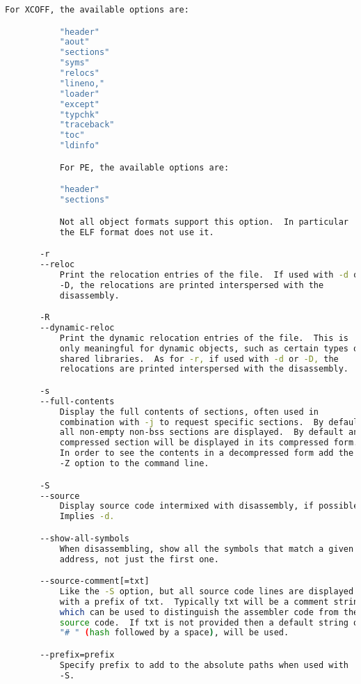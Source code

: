 {{\begin{lstlisting}[language=bash]
           For XCOFF, the available options are:

           "header"
           "aout"
           "sections"
           "syms"
           "relocs"
           "lineno,"
           "loader"
           "except"
           "typchk"
           "traceback"
           "toc"
           "ldinfo"

           For PE, the available options are:

           "header"
           "sections"

           Not all object formats support this option.  In particular
           the ELF format does not use it.

       -r
       --reloc
           Print the relocation entries of the file.  If used with -d or
           -D, the relocations are printed interspersed with the
           disassembly.

       -R
       --dynamic-reloc
           Print the dynamic relocation entries of the file.  This is
           only meaningful for dynamic objects, such as certain types of
           shared libraries.  As for -r, if used with -d or -D, the
           relocations are printed interspersed with the disassembly.

       -s
       --full-contents
           Display the full contents of sections, often used in
           combination with -j to request specific sections.  By default
           all non-empty non-bss sections are displayed.  By default any
           compressed section will be displayed in its compressed form.
           In order to see the contents in a decompressed form add the
           -Z option to the command line.

       -S
       --source
           Display source code intermixed with disassembly, if possible.
           Implies -d.

       --show-all-symbols
           When disassembling, show all the symbols that match a given
           address, not just the first one.

       --source-comment[=txt]
           Like the -S option, but all source code lines are displayed
           with a prefix of txt.  Typically txt will be a comment string
           which can be used to distinguish the assembler code from the
           source code.  If txt is not provided then a default string of
           "# " (hash followed by a space), will be used.

       --prefix=prefix
           Specify prefix to add to the absolute paths when used with
           -S.


\end{lstlisting}}}
